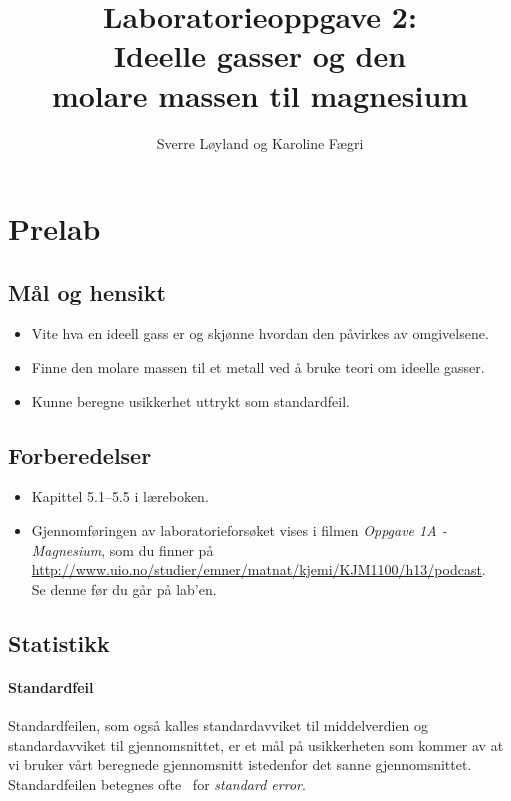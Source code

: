 
 

\title{Laboratorieoppgave 2:\\
	Ideelle gasser og den \\
	molare massen til magnesium}
\author{Sverre Løyland og Karoline Fægri}
\date{}


	
	\maketitle
	
	\section{Prelab}
	
	\subsection{Mål og hensikt}
	\begin{itemize}
		\item Vite hva en ideell gass er og skjønne hvordan den påvirkes av omgivelsene.
		\item Finne den molare massen til et metall ved å bruke teori om ideelle gasser.
		\item Kunne beregne usikkerhet uttrykt som standardfeil. 
	\end{itemize}
	
	\subsection{Forberedelser}
	\begin{itemize}
		\item Kapittel 5.1--5.5 i læreboken.
		\item Gjennomføringen av laboratorieforsøket vises i filmen \emph{Oppgave 1A - Magnesium}, som du finner på \\ \url{http://www.uio.no/studier/emner/matnat/kjemi/KJM1100/h13/podcast}. \\
		Se denne før du går på lab'en.
	\end{itemize}
	
	\subsection{Statistikk}
	\paragraph{Standardfeil}
	Standardfeilen, som også kalles standardavviket til middelverdien og standardavviket til gjennomsnittet, er et mål på usikkerheten som kommer av at vi bruker vårt beregnede gjennomsnitt istedenfor det sanne gjennomsnittet. Standardfeilen betegnes ofte \SE\ for \emph{standard error}.
	
